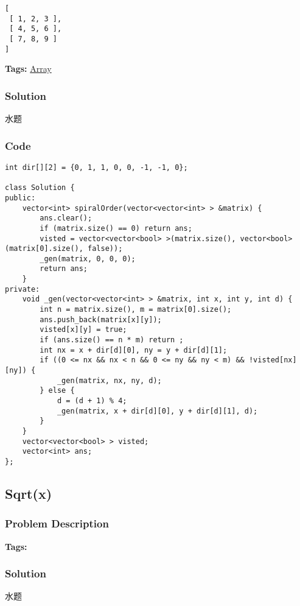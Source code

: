\documentclass{article}
\begin{document}
\begin{CJK*}{UTF8}{gkai}
\begin{verbatim}
[
 [ 1, 2, 3 ],
 [ 4, 5, 6 ],
 [ 7, 8, 9 ]
]
\end{verbatim}

\textbf{Tags: }
\hyperref[ Array ]{ Array }



\subsubsection*{Solution}
水题

\subsubsection*{Code}
\begin{lstlisting}
int dir[][2] = {0, 1, 1, 0, 0, -1, -1, 0};

class Solution {
public:
    vector<int> spiralOrder(vector<vector<int> > &matrix) {
        ans.clear();
        if (matrix.size() == 0) return ans;
        visted = vector<vector<bool> >(matrix.size(), vector<bool>(matrix[0].size(), false));
        _gen(matrix, 0, 0, 0);
        return ans;
    }
private:
    void _gen(vector<vector<int> > &matrix, int x, int y, int d) {
        int n = matrix.size(), m = matrix[0].size();
        ans.push_back(matrix[x][y]);
        visted[x][y] = true;
        if (ans.size() == n * m) return ;
        int nx = x + dir[d][0], ny = y + dir[d][1];
        if ((0 <= nx && nx < n && 0 <= ny && ny < m) && !visted[nx][ny]) {
            _gen(matrix, nx, ny, d);
        } else {
            d = (d + 1) % 4;
            _gen(matrix, x + dir[d][0], y + dir[d][1], d);
        }
    }
    vector<vector<bool> > visted;
    vector<int> ans;
}; 
\end{lstlisting}


\subsection{ Sqrt(x) }
\label{ Sqrt(x) }

\subsubsection*{Problem Description}

\textbf{Tags: }



\subsubsection*{Solution}
水题


\end{CJK*}
\end{document}
